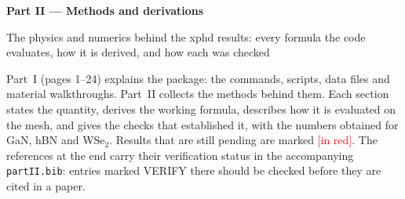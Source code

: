 \documentclass[10pt,a4paper]{article}
\newcommand{\tbd}[1]{\textcolor{red}{[#1]}}
\begin{document}
\setcounter{page}{25}
\setcounter{section}{11}

\thispagestyle{fancy}
{\color{ink}\huge\bfseries Part II --- Methods and derivations\par}
\vspace{0.6ex}
{\color{accent}\large The physics and numerics behind the xphd results: every
formula the code evaluates, how it is derived, and how each was checked\par}
\vspace{1.2ex}

Part~I (pages 1--24) explains the package: the commands, scripts, data files and
material walkthroughs. Part~II collects the methods behind them. Each section
states the quantity, derives the working formula, describes how it is evaluated
on the mesh, and gives the checks that established it, with the numbers
obtained for GaN, hBN and WSe$_2$. Results that are still pending are marked
\tbd{in red}. The references at the end carry their verification status in the
accompanying \texttt{partII.bib}: entries marked VERIFY there should be checked
before they are cited in a paper.

\vspace{0.6ex}
{\setlength{\parskip}{0pt}\small\tableofcontents}
\end{document}
